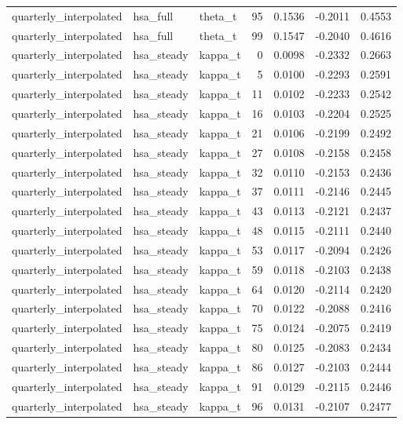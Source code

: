 \begin{tabular}{lllrrrr}
quarterly\_interpolated & hsa\_full & theta\_t & 95 & 0.1536 & -0.2011 & 0.4553 \\
quarterly\_interpolated & hsa\_full & theta\_t & 99 & 0.1547 & -0.2040 & 0.4616 \\
quarterly\_interpolated & hsa\_steady & kappa\_t & 0 & 0.0098 & -0.2332 & 0.2663 \\
quarterly\_interpolated & hsa\_steady & kappa\_t & 5 & 0.0100 & -0.2293 & 0.2591 \\
quarterly\_interpolated & hsa\_steady & kappa\_t & 11 & 0.0102 & -0.2233 & 0.2542 \\
quarterly\_interpolated & hsa\_steady & kappa\_t & 16 & 0.0103 & -0.2204 & 0.2525 \\
quarterly\_interpolated & hsa\_steady & kappa\_t & 21 & 0.0106 & -0.2199 & 0.2492 \\
quarterly\_interpolated & hsa\_steady & kappa\_t & 27 & 0.0108 & -0.2158 & 0.2458 \\
quarterly\_interpolated & hsa\_steady & kappa\_t & 32 & 0.0110 & -0.2153 & 0.2436 \\
quarterly\_interpolated & hsa\_steady & kappa\_t & 37 & 0.0111 & -0.2146 & 0.2445 \\
quarterly\_interpolated & hsa\_steady & kappa\_t & 43 & 0.0113 & -0.2121 & 0.2437 \\
quarterly\_interpolated & hsa\_steady & kappa\_t & 48 & 0.0115 & -0.2111 & 0.2440 \\
quarterly\_interpolated & hsa\_steady & kappa\_t & 53 & 0.0117 & -0.2094 & 0.2426 \\
quarterly\_interpolated & hsa\_steady & kappa\_t & 59 & 0.0118 & -0.2103 & 0.2438 \\
quarterly\_interpolated & hsa\_steady & kappa\_t & 64 & 0.0120 & -0.2114 & 0.2420 \\
quarterly\_interpolated & hsa\_steady & kappa\_t & 70 & 0.0122 & -0.2088 & 0.2416 \\
quarterly\_interpolated & hsa\_steady & kappa\_t & 75 & 0.0124 & -0.2075 & 0.2419 \\
quarterly\_interpolated & hsa\_steady & kappa\_t & 80 & 0.0125 & -0.2083 & 0.2434 \\
quarterly\_interpolated & hsa\_steady & kappa\_t & 86 & 0.0127 & -0.2103 & 0.2444 \\
quarterly\_interpolated & hsa\_steady & kappa\_t & 91 & 0.0129 & -0.2115 & 0.2446 \\
quarterly\_interpolated & hsa\_steady & kappa\_t & 96 & 0.0131 & -0.2107 & 0.2477 \\

\end{tabular}
